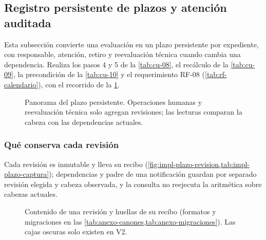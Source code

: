 \subsection{Registro persistente de plazos y atención auditada}\label{sec:implementacion-plazos-persistentes}

Esta subsección convierte una evaluación en un plazo persistente por expediente, con responsable, atención, retiro y reevaluación técnica cuando cambia una dependencia. Realiza los pasos 4 y 5 de la \cref{tab:cu-08}, el recálculo de la \cref{tab:cu-09}, la precondición de la \cref{tab:cu-10} y el requerimiento RF-08 (\cref{tab:rf-calendario}), con el recorrido de la \cref{fig:impl-plazo-panorama}.

\begin{figure}[!htbp]
  \centering
  
  \caption{Panorama del plazo persistente. Operaciones humanas y reevaluación técnica solo agregan revisiones; las lecturas comparan la cabeza con las dependencias actuales.}
  \label{fig:impl-plazo-panorama}
\end{figure}

\subsubsection{Qué conserva cada revisión}

Cada revisión es inmutable y lleva su recibo (\cref{fig:impl-plazo-revision,tab:impl-plazo-captura}); dependencias y padre de una notificación guardan por separado revisión elegida y cabeza observada, y la consulta no reejecuta la aritmética sobre cabezas actuales.

\begin{figure}[t]
  \centering
  
  \caption{Contenido de una revisión y huellas de su recibo (formatos y migraciones en las \cref{tab:anexo-canones,tab:anexo-migraciones}). Las cajas oscuras solo existen en V2.}
  \label{fig:impl-plazo-revision}
\end{figure}

